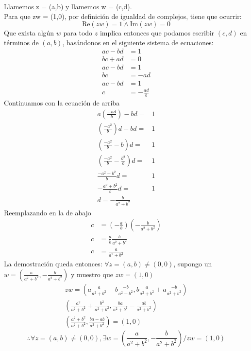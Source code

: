 \documentclass[10pt]{article}
\begin{document}
\begin{prf}[$\forall z \neq (0,0) \exists w / zw = (1,0)$]{}
	Llamemos z = (a,b) y llamemos w = (c,d).\\
	Para que zw = (1,0), por definición de igualdad de complejos, tiene que ocurrir: 
	\begin{equation}
		\text{Re}(zw) = 1 \land \text{Im}(zw) = 0
	\end{equation}
	Que exista algún $w$ para todo $z$ implica entonces que podamos escribir $(c,d)$ en términos de $(a,b)$, basándonos en el siguiente sistema de ecuaciones:
	\begin{align}
		ac - bd &= 1\\
		bc + ad &= 0\\
		ac - bd &= 1\\
		bc &= -ad\\
		ac - bd &= 1\\
		c &= -\frac{ad}{b}
	\end{align}
	Continuamos con la ecuación de arriba
	\begin{align}
		a\left(\frac{-ad}{b}\right) - bd =& 1\\
		\left(\frac{-a^2}{b}\right)d - bd =& 1\\
		\left(\frac{-a^2}{b} - b\right)d =& 1\\
		\left(\frac{-a^2}{b} - \frac{b^2}{b}\right)d =& 1\\
		\frac{-a^2 - b^2}{b}d =& 1\\
		-\frac{a^2 + b^2}{b}d =& 1\\
		d = -\frac{b}{a^2 + b^2}&
	\end{align}
	Reemplazando en la de abajo
	\begin{align}
		c &= \left(-\frac{a}{b}\right)\left(-\frac{b}{a^2 + b^2}\right)\\
		c &= \frac{a}{b}\frac{b}{a^2 + b^2}\\
		c &= \frac{a}{a^2 + b^2}
	\end{align}
	La demostración queda entonces:
	$\forall z = (a,b) \neq (0,0)$, supongo un $w = \left(\frac{a}{a^2 + b^2}, -\frac{b}{a^2 + b^2}\right)$ y muestro que $zw = (1,0)$
	\begin{align}
		zw = \left(a\frac{a}{a^2 + b^2} - b\frac{-b}{a^2 + b^2}, b\frac{a}{a^2 + b^2} + a\frac{-b}{a^2 + b^2}\right)\\
		\left(\frac{a^2}{a^2 + b^2} + \frac{b^2}{a^2 + b^2}, \frac{ba}{a^2 + b^2} - \frac{ab}{a^2 + b^2}\right)\\
		\left(\frac{a^2 + b^2}{a^2 + b^2}, \frac{ba - ab}{a^2 + b^2}\right) = (1,0)
	\end{align}
	$$\therefore \forall z = (a,b) \neq (0,0), \exists w = (\frac{a}{a^2 + b^2}, -\frac{b}{a^2 + b^2}) / zw = (1,0)$$
\end{prf}
\end{document}
